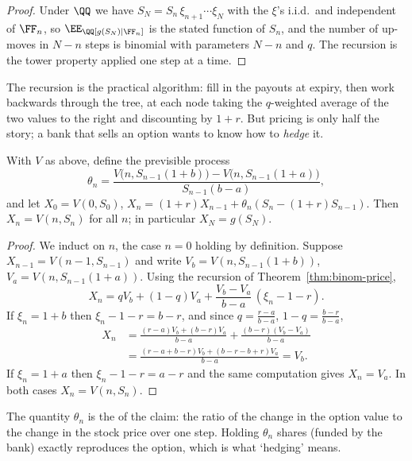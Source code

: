 \begin{proof}
	Under $\QQ$ we have $S_N = S_n\,\xi_{n+1}\cdots\xi_N$ with the $\xi$'s i.i.d.\ and independent of $\FF_n$, so $\EE_\QQ[g(S_N)\mid\FF_n]$ is the stated function of $S_n$, and the number of up-moves in $N-n$ steps is binomial with parameters $N-n$ and $q$. The recursion is the tower property applied one step at a time.
\end{proof}

The recursion is the practical algorithm: fill in the payouts at expiry, then work backwards through the tree, at each node taking the $q$-weighted average of the two values to the right and discounting by $1+r$. But pricing is only half the story; a bank that sells an option wants to know how to \emph{hedge} it.

\begin{theorem}[Replication]\label{thm:binom-replication}
	With $V$ as above, define the previsible process
	$$
	\theta_n = \frac{V\big(n, S_{n-1}(1+b)\big) - V\big(n,S_{n-1}(1+a)\big)}{S_{n-1}(b-a)},
	$$
	and let $X_0 = V(0,S_0)$, $X_n = (1+r)X_{n-1} + \theta_n(S_n - (1+r)S_{n-1})$. Then $X_n = V(n,S_n)$ for all $n$; in particular $X_N = g(S_N)$.
\end{theorem}

\begin{proof}
	We induct on $n$, the case $n = 0$ holding by definition. Suppose $X_{n-1} = V(n-1,S_{n-1})$ and write $V_b = V(n,S_{n-1}(1+b))$, $V_a = V(n,S_{n-1}(1+a))$. Using the recursion of Theorem~\ref{thm:binom-price},
	$$
	X_n = qV_b + (1-q)V_a + \frac{V_b - V_a}{b-a}\,(\xi_n - 1 - r).
	$$
	If $\xi_n = 1+b$ then $\xi_n - 1 - r = b-r$, and since $q = \frac{r-a}{b-a}$, $1-q = \frac{b-r}{b-a}$,
	\begin{align*}
		X_n &= \frac{(r-a)V_b + (b-r)V_a}{b-a} + \frac{(b-r)(V_b-V_a)}{b-a}\\
		&= \frac{(r-a+b-r)V_b + (b-r-b+r)V_a}{b-a} = V_b.
	\end{align*}
	If $\xi_n = 1+a$ then $\xi_n - 1 - r = a - r$ and the same computation gives $X_n = V_a$. In both cases $X_n = V(n,S_n)$.
\end{proof}

The quantity $\theta_n$ is the  of the claim: the ratio of the change in the option value to the change in the stock price over one step. Holding $\theta_n$ shares (funded by the bank) exactly reproduces the option, which is what `hedging' means.

